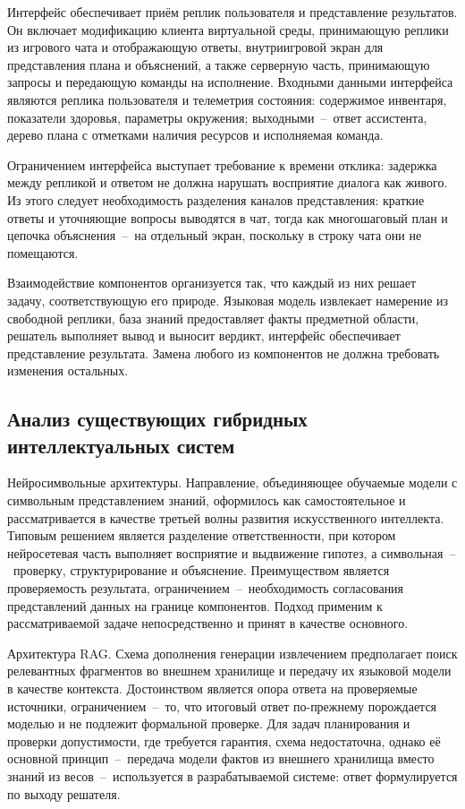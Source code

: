 Интерфейс обеспечивает приём реплик пользователя и представление результатов.
Он включает модификацию клиента виртуальной среды, принимающую реплики из игрового
чата и отображающую ответы, внутриигровой экран для представления плана и
объяснений, а также серверную часть, принимающую запросы и передающую команды на
исполнение. Входными данными интерфейса являются реплика пользователя и телеметрия
состояния: содержимое инвентаря, показатели здоровья, параметры окружения;
выходными~--~ответ ассистента, дерево плана с отметками наличия ресурсов и
исполняемая команда.

Ограничением интерфейса выступает требование к времени отклика: задержка между
репликой и ответом не должна нарушать восприятие диалога как живого. Из этого
следует необходимость разделения каналов представления: краткие ответы и уточняющие
вопросы выводятся в чат, тогда как многошаговый план и цепочка объяснения~--~на
отдельный экран, поскольку в строку чата они не помещаются.

Взаимодействие компонентов организуется так, что каждый из них решает задачу,
соответствующую его природе. Языковая модель извлекает намерение из свободной
реплики, база знаний предоставляет факты предметной области, решатель выполняет
вывод и выносит вердикт, интерфейс обеспечивает представление результата. Замена
любого из компонентов не должна требовать изменения остальных.

\subsection{Анализ существующих гибридных интеллектуальных систем}

Нейросимвольные архитектуры. Направление, объединяющее обучаемые модели с
символьным представлением знаний, оформилось как самостоятельное и рассматривается
в качестве третьей волны развития искусственного интеллекта.
Типовым решением является разделение ответственности, при котором нейросетевая
часть выполняет восприятие и выдвижение гипотез, а символьная~--~проверку,
структурирование и объяснение. Преимуществом является проверяемость результата,
ограничением~--~необходимость согласования представлений данных на границе
компонентов. Подход применим к рассматриваемой задаче непосредственно и принят
в качестве основного\cite{Garcez2023}.

Архитектура RAG. Схема дополнения генерации извлечением
предполагает поиск релевантных фрагментов во внешнем хранилище и передачу их
языковой модели в качестве контекста. Достоинством является опора ответа на
проверяемые источники, ограничением~--~то, что итоговый ответ по-прежнему
порождается моделью и не подлежит формальной проверке. Для задач планирования и
проверки допустимости, где требуется гарантия, схема недостаточна, однако её
основной принцип~--~передача модели фактов из внешнего хранилища вместо знаний из
весов~--~используется в разрабатываемой системе: ответ формулируется по выходу
решателя\cite{Lewis2020}.

